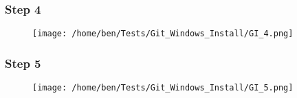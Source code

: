 \documentclass[xcolor=dvipsnames]{beamer}
\begin{document}
\begin{frame}
\frametitle{Step 4}
\begin{center}
\begin{figure}
\texttt{[image: /home/ben/Tests/Git\_Windows\_Install/GI\_4.png]}
\end{figure}
\end{center}
\end{frame}


\begin{frame}
\frametitle{Step 5}
\begin{center}
\begin{figure}
\texttt{[image: /home/ben/Tests/Git\_Windows\_Install/GI\_5.png]}
\end{figure}
\end{center}
\end{frame}
\end{document}
